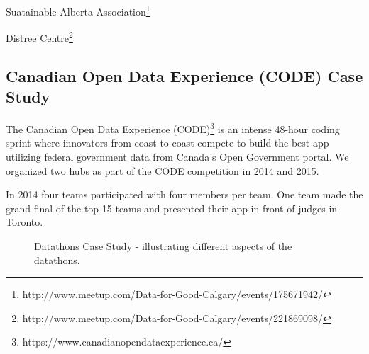 Suatainable Alberta Association\footnote{http://www.meetup.com/Data-for-Good-Calgary/events/175671942/}

Distree Centre\footnote{http://www.meetup.com/Data-for-Good-Calgary/events/221869098/}


\subsection{Canadian Open Data Experience (CODE) Case Study}

The Canadian Open Data Experience (CODE)\footnote{https://www.canadianopendataexperience.ca/} is an intense 48-hour coding sprint where innovators from coast to coast compete to build the best app utilizing federal government data from Canada's Open Government portal. We organized two hubs as part of the CODE competition in 2014 and 2015. 

In 2014 four teams participated with four members per team.  One team made the grand final of the top 15 teams and presented their app in front of judges in Toronto.

\begin{figure}[!htb] %
\begin{center}
\caption{Datathons Case Study - illustrating different aspects of the datathons.}
\label{fig:datathons}
\end{center}
\end{figure}